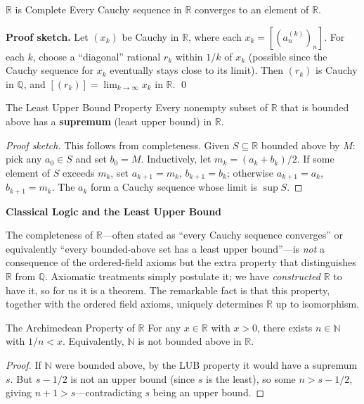 \documentclass[12pt, openany]{book}
\theoremstyle{plain}
\theoremstyle{definition}
\theoremstyle{remark}
\newcommand{\N}{\mathbb{N}}
\newcommand{\Q}{\mathbb{Q}}
\newcommand{\R}{\mathbb{R}}
\begin{document}
\begin{thmbox}{$\R$ is Complete}
Every Cauchy sequence in $\R$ converges to an element of $\R$.

\textbf{Proof sketch.} Let $(x_k)$ be Cauchy in $\R$, where each $x_k = [(a_n^{(k)})_n]$. For each $k$, choose a ``diagonal'' rational $r_k$ within $1/k$ of $x_k$ (possible since the Cauchy sequence for $x_k$ eventually stays close to its limit). Then $(r_k)$ is Cauchy in $\Q$, and $[(r_k)] = \lim_{k \to \infty} x_k$ in $\R$. \qed
\end{thmbox}

\begin{thmbox}{The Least Upper Bound Property}
Every nonempty subset of $\R$ that is bounded above has a \textbf{supremum} (least upper bound) in $\R$.
\end{thmbox}
\color{black}

\begin{proof}[Proof sketch]
This follows from completeness. Given $S \subseteq \R$ bounded above by $M$: pick any $a_0 \in S$ and set $b_0 = M$. Inductively, let $m_k = (a_k + b_k)/2$. If some element of $S$ exceeds $m_k$, set $a_{k+1} = m_k$, $b_{k+1} = b_k$; otherwise $a_{k+1} = a_k$, $b_{k+1} = m_k$. The $a_k$ form a Cauchy sequence whose limit is $\sup S$.
\end{proof}

\begin{remarkbox}
\textbf{Classical Logic and the Least Upper Bound}

The completeness of $\R$---often stated as ``every Cauchy sequence converges'' or equivalently ``every bounded-above set has a least upper bound''---is \emph{not} a consequence of the ordered-field axioms but the extra property that distinguishes $\R$ from $\Q$. Axiomatic treatments simply postulate it; we have \emph{constructed} $\R$ to have it, so for us it is a theorem. The remarkable fact is that this property, together with the ordered field axioms, uniquely determines $\R$ up to isomorphism.
\end{remarkbox}
\color{black}

\begin{thmbox}{The Archimedean Property of $\R$}
For any $x \in \R$ with $x > 0$, there exists $n \in \N$ with $1/n < x$.
Equivalently, $\N$ is not bounded above in $\R$.
\end{thmbox}
\color{black}

\begin{proof}
If $\N$ were bounded above, by the LUB property it would have a supremum $s$. But $s - 1/2$ is not an upper bound (since $s$ is the least), so some $n > s - 1/2$, giving $n + 1 > s$---contradicting $s$ being an upper bound.
\end{proof}
\end{document}
